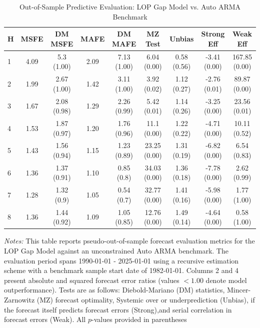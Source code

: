 \begin{table}[htbp]
\centering
\caption{Out-of-Sample Predictive Evaluation: LOP Gap Model vs. Auto ARMA Benchmark}
\label{tab:lop_gap_model_evaluation}
\footnotesize
\begin{tabular}{l cccccccc}
\hline\hline
\rule{0pt}{3ex}
\textbf{H} & \textbf{MSFE} & \textbf{DM MSFE} & \textbf{MAFE} & \textbf{DM MAFE} & \textbf{MZ Test} & \textbf{Unbias} & \textbf{Strong Eff} & \textbf{Weak Eff} \\[0.5ex]
\hline
\rule{0pt}{2.5ex}
1 & 4.09 & 5.3 (1.00) & 2.09 & 7.13 (1.00) & 6.04 (0.00) & 0.58 (0.56) & -3.41 (0.00) & 167.85 (0.00) \\
2 & 1.99 & 2.67 (1.00) & 1.42 & 3.11 (1.00) & 3.92 (0.02) & 1.12 (0.27) & -2.76 (0.01) & 89.87 (0.00) \\
3 & 1.67 & 2.08 (0.98) & 1.29 & 2.26 (0.99) & 5.42 (0.01) & 1.14 (0.26) & -3.25 (0.00) & 23.56 (0.01) \\
4 & 1.53 & 1.87 (0.97) & 1.20 & 1.76 (0.96) & 11.1 (0.00) & 1.22 (0.22) & -4.71 (0.00) & 10.11 (0.52) \\
5 & 1.43 & 1.56 (0.94) & 1.15 & 1.23 (0.89) & 23.25 (0.00) & 1.31 (0.19) & -6.82 (0.00) & 6.54 (0.83) \\
6 & 1.36 & 1.37 (0.91) & 1.10 & 0.85 (0.8) & 34.03 (0.00) & 1.36 (0.18) & -7.78 (0.00) & 2.62 (0.99) \\
7 & 1.28 & 1.32 (0.9) & 1.05 & 0.54 (0.7) & 32.77 (0.00) & 1.41 (0.16) & -5.98 (0.00) & 1.77 (1.00) \\
8 & 1.36 & 1.44 (0.92) & 1.09 & 1.05 (0.85) & 12.76 (0.00) & 1.49 (0.14) & -4.64 (0.00) & 0.58 (1.00) \\
\hline\hline
\end{tabular}%
\par\smallskip
\parbox{\textwidth}{\scriptsize \textit{Notes:} This table reports pseudo-out-of-sample forecast evaluation metrics for the LOP Gap Model against an unconstrained Auto ARMA benchmark. The evaluation period spans 1990-01-01 - 2025-01-01 using a recursive estimation scheme with a benchmark sample start date of 1982-01-01. Columns 2 and 4 present absolute and squared forecast error ratios (values $< 1.00$ denote model outperformance). Tests are as follows: Diebold-Mariano (DM) statistics, Mincer-Zarnowitz (MZ) forecast optimality, Systemic over or underprediction (Unbias), if the forecast itself predicts forecast errors (Strong),and serial correlation in forecast errors (Weak). All $p$-values provided in parentheses}
\end{table}
